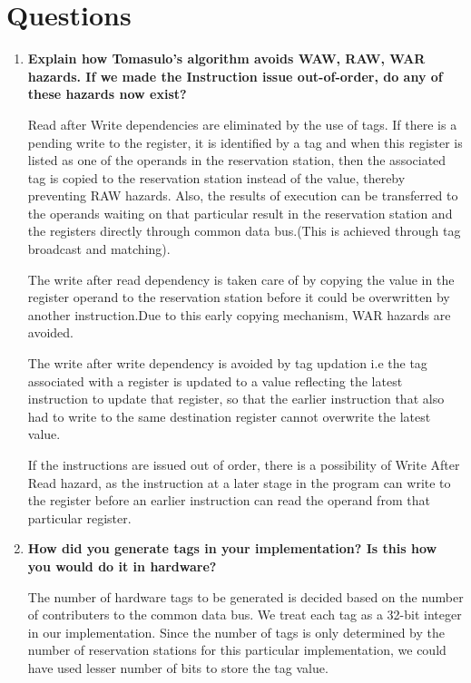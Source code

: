 \section{Questions}
\begin{enumerate}
    \item
        {\bf Explain how Tomasulo's algorithm avoids WAW, RAW, WAR hazards. If we made the Instruction issue out-of-order, do any of these hazards now exist?}
        
    Read after Write dependencies are eliminated by the use of tags. If there is a pending write to the register, it is identified by a tag and when this register is listed as one of the operands in the reservation station, then the associated tag is copied to the reservation station instead of the value, thereby preventing RAW hazards. Also, the results of execution can be transferred to the operands waiting on that particular result in the reservation station and the registers directly through common data bus.(This is achieved through tag broadcast and matching).\cite{text}
    
    The write after read dependency is taken care of by copying the value in the register operand to the reservation station before it could be overwritten by another instruction.Due to this early copying mechanism, WAR hazards are avoided.
\cite{text}

   The write after write dependency is avoided by tag updation i.e the tag associated with a register is updated to a value reflecting the latest instruction to update that register, so that the earlier instruction that also had to write to the same destination register cannot overwrite the latest value.\cite{text}
   
   If the instructions are issued out of order, there is a possibility of Write After Read hazard, as the instruction at a later stage in the program can write to the register before an earlier instruction can read the operand from that particular register.
    

    \item
        {\bf How did you generate tags in your implementation? Is this how you would do it in hardware?}
        
        The number of hardware tags to be generated is decided based on the number of contributers to the common data bus. We treat each tag as a 32-bit integer in our implementation. Since the number of tags is only determined by the number of reservation stations for this particular implementation, we could have used lesser number of bits to store the tag value.
        

\end{enumerate}
